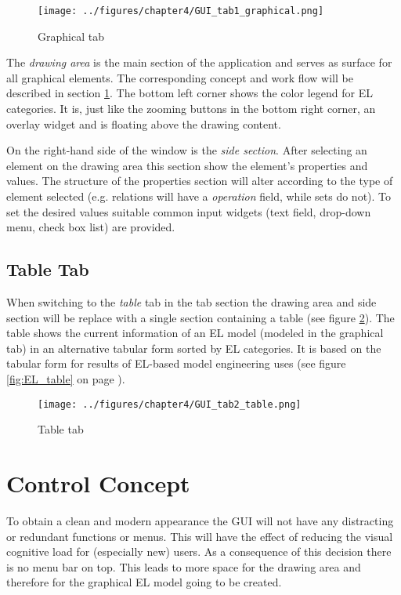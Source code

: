 \documentclass[twoside, openright, 12pt]{book}
\begin{document}
\begin{figure}[htb]
	\centering
	\texttt{[image: ../figures/chapter4/GUI\_tab1\_graphical.png]}
	\caption{Graphical tab}
	\label{fig:GUI_tab1_graphical}
\end{figure}

\noindent
The \textit{drawing area} is the main section of the application and serves as surface for all graphical elements.
The corresponding concept and work flow will be described in section \ref{GUI_concept}.
The bottom left corner shows the color legend for EL categories.
It is, just like the zooming buttons in the bottom right corner, an overlay widget and is floating above the drawing content.

On the right-hand side of the window is the \textit{side section}.
After selecting an element on the drawing area this section show the element's properties and values.
The structure of the properties section will alter according to the type of element selected (e.g. relations will have a \textit{operation} field, while sets do not).
To set the desired values suitable common input widgets (text field, drop-down menu, check box list) are provided.



\subsection{Table Tab}
\label{editor_table}
When switching to the \textit{table} tab in the tab section the drawing area and side section will be replace with a single section containing a table (see figure \ref{fig:GUI_tab2_table}).
The table shows the current information of an EL model (modeled in the graphical tab) in an alternative tabular form sorted by EL categories.
It is based on the tabular form for results of EL-based model engineering \cite{Amthor18} uses (see figure \ref{fig:EL_table} on page \pageref{fig:EL_table}).

\begin{figure}[htb]
	\centering
	\texttt{[image: ../figures/chapter4/GUI\_tab2\_table.png]}
	\caption{Table tab}
	\label{fig:GUI_tab2_table}
\end{figure}



\section{Control Concept}
\label{GUI_concept}
To obtain a clean and modern appearance the GUI will not have any distracting or redundant functions or menus.
This will have the effect of reducing the visual cognitive load for (especially new) users.
As a consequence of this decision there is no menu bar on top.
This leads to more space for the drawing area and therefore for the graphical EL model going to be created.
\end{document}
